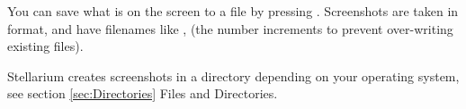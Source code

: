 You can save what is on the screen to a file by pressing
. Screenshots are taken in  format, and
have filenames like ,
 (the number increments to prevent
over-writing existing files).

Stellarium creates screenshots in a directory depending on
your operating system, see section
\ref{sec:Directories} Files and Directories.







